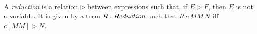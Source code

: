 \begin{code}%
\>[0]\<[2]%
\>[2]  \<%
\\
\>[0]\<[2]%
\>[2]   \AgdaSymbol{:}     \<%
\\
\>[2]\<[4]%
\>[4]\AgdaInductiveConstructor{[]} \AgdaSymbol{:}   \AgdaInductiveConstructor{[]}\<%
\\
\>[2]\<[4]%
\>[4] \AgdaSymbol{:}  \AgdaSymbol{\{}\AgdaSymbol{\}} \AgdaSymbol{\{}\AgdaSymbol{\}}        \AgdaSymbol{(} \AgdaSymbol{)}    \AgdaSymbol{(}  \AgdaSymbol{)}\<%
\end{code}

A \emph{reduction} is a relation $\rhd$ between expressions such that, if $E \rhd F$,
then $E$ is not a variable.  It is given by a term $R : Reduction$ such that
$R\, c\, MM\, N$ iff $c[MM] \rhd N$.

